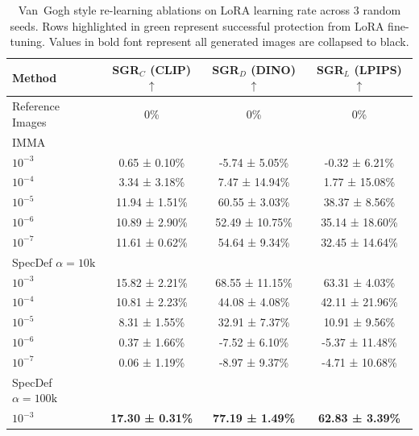 \documentclass{article}
\theoremstyle{plain}
\theoremstyle{definition}
\theoremstyle{remark}
\begin{document}
\begin{table}[!htp]
\centering
\caption{Van~Gogh style re-learning ablations on LoRA learning rate across 3 random seeds. Rows highlighted in green represent successful protection from LoRA fine-tuning. Values in bold font represent all generated images are collapsed to black. }
\begin{sc}
\begin{tabular}{lccc}
\toprule
Method
& SGR$_C$ (CLIP) $\uparrow$ 
& SGR$_D$ (DINO) $\uparrow$ 
& SGR$_L$ (LPIPS) $\uparrow$\\
\midrule
Reference Images & 0\% & 0\% & 0\% \\
\midrule
IMMA \citep{zheng2024imma} \\
\hspace{1mm} $10^{-3}$ & 0.65 ± 0.10\% & -5.74 ± 5.05\% & -0.32 ± 6.21\% \\
\hspace{1mm} $10^{-4}$ & 3.34 ± 3.18\% & 7.47 ± 14.94\% & 1.77 ± 15.08\% \\
\hspace{1mm} $10^{-5}$ & 11.94 ± 1.51\% & 60.55 ± 3.03\% & 38.37 ± 8.56\% \\
\hspace{1mm} $10^{-6}$ & 10.89 ± 2.90\% & 52.49 ± 10.75\% & 35.14 ± 18.60\% \\
\hspace{1mm} $10^{-7}$ & 11.61 ± 0.62\% & 54.64 ± 9.34\% & 32.45 ± 14.64\% \\
\midrule
SpecDef $\alpha=10\mathrm{k}$ \\
\rowcolor{green!10}
\hspace{1mm} $10^{-3}$ & 15.82 ± 2.21\% & 68.55 ± 11.15\% & 63.31 ± 4.03\% \\
\rowcolor{green!10}
\hspace{1mm} $10^{-4}$ & 10.81 ± 2.23\% & 44.08 ± 4.08\% & 42.11 ± 21.96\% \\
\rowcolor{green!10}
\hspace{1mm} $10^{-5}$ & 8.31 ± 1.55\% & 32.91 ± 7.37\% & 10.91 ± 9.56\% \\
\hspace{1mm} $10^{-6}$ & 0.37 ± 1.66\% & -7.52 ± 6.10\% & -5.37 ± 11.48\% \\
\hspace{1mm} $10^{-7}$ & 0.06 ± 1.19\% & -8.97 ± 9.37\% & -4.71 ± 10.68\% \\
\midrule
SpecDef $\alpha=100\mathrm{k}$ \\
\rowcolor{green!10}
\hspace{1mm} $10^{-3}$ & \textbf{17.30 ± 0.31\%} & \textbf{77.19 ± 1.49\%} & \textbf{62.83 ± 3.39\%} \\

\end{tabular}
\end{sc}
\end{table}
\end{document}
